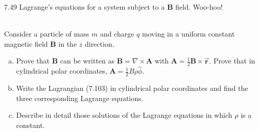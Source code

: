 \documentclass[11pt,letterpaper,boxed]{../hmcpsetrhino}
\newcommand{\half}{\frac{1}{2}}
\let\oldvec\vec
\renewcommand{\vec}[1]{\oldvec{\mathbf{#1}}}
\begin{document}
\begin{solution}

\vfill
\end{solution}


\newpage

\begin{problem}[iii]
7.49 Lagrange's equations for a system subject to a $\mathbf{B}$ field. Woo-hoo!\\
\hfill\\
\begin{problem}[7.49]
Consider a particle of mass $m$ and charge $q$ moving in a uniform constant magnetic field $\mathbf{B}$ in the $z$ direction. 
\begin{enumerate}[(a)]
\item Prove that $\mathbf{B}$ can be written as $\mathbf{B} = \nabla \times \mathbf{A}$ with $\mathbf{A} = \half \mathbf{B} \times \vec r$. Prove that in cylindrical polar coordinates, $\mathbf{A} = \half B \rho \hat \phi$. 
\item Write the Lagrangian (7.103) in cylindrical polar coordinates and find the three corresponding Lagrange equations. 
\item Describe in detail those solutions of the Lagrange equations in which $\rho$ is a constant.

\end{enumerate}
\end{problem}
\vspace{-0.45cm}
\end{problem}

\begin{solution}

\vfill
\end{solution}
\end{document}

